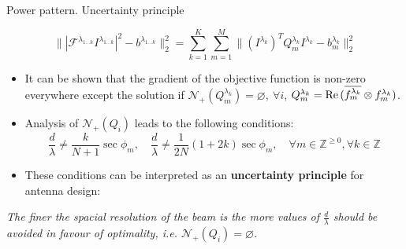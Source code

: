 \documentclass[../main.tex]{subfiles}
\begin{document}
\begin{frame}[t]{Power pattern. Uncertainty principle}

\begin{equation*}
\Big\| |\mathcal{F}^{\lambda_{1 \ldots k}} I^{\lambda_{1\ldots k}}|^2 - b^{\lambda_{1 \ldots k}} \Big\|_2^2 = \sum_{k=1}^K \sum_{m=1}^M \Big\| (I^{\lambda_{k}})^T Q^{\lambda_{k}}_m  I^{\lambda_{k}} - b^{\lambda_{k}}_m \Big\|_2^2
\end{equation*}


 
\begin{itemize}
	\item It can be shown that the gradient of the objective function is non-zero everywhere except the solution if $\mathcal{N}_{+}(Q^{\lambda_{k}}_m) = \varnothing, ~\forall i$, $Q^{\lambda_{k}}_m = \operatorname{Re}{(\overline{f_m^{\lambda_{k}}} \otimes f_m^{\lambda_{k}})}$.
	\item Analysis of $\mathcal{N}_{+}(Q_i)$ leads to the following conditions:
	\begin{equation*}
  \frac{d}{\lambda} \neq \frac{k}{N+1} \sec \phi_m , \quad \frac{d}{\lambda} \neq \frac{1}{2N} (1 + 2k) \sec \phi_m, \quad \forall m \in \mathbb{Z}^{\ge 0}, \forall k \in \mathbb{Z}
  \label{antenna_design_condition}
	\end{equation*}
	\item These conditions can be interpreted as an \textbf{uncertainty principle} for antenna design: 
\end{itemize}

\begin{center}
\begin{tcolorbox}
\textit{The finer the spacial resolution of the beam is the more values of $\frac{d}{\lambda}$ should be avoided in favour of optimality, i.e. $\mathcal{N}_{+}(Q_i) = \varnothing$.}
\end{tcolorbox}
\end{center}

\end{frame}
\end{document}
